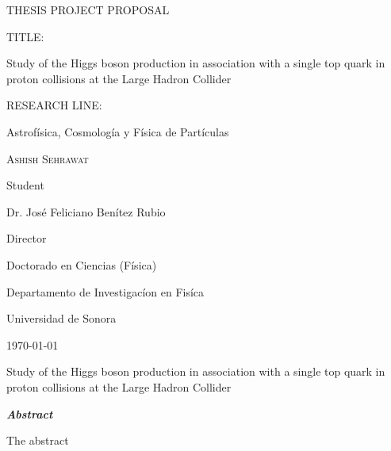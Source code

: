 \documentclass[final,3p]{CSP}
\def\Student{Ashish Sehrawat}
\def\Title{THESIS PROJECT PROPOSAL}
\def\Prog{Doctorado en Ciencias (F\'{i}sica) }
\def\Dept{Departamento de Investigac\'{i}on en Fis\'{i}ca}
\def\Director{Dr. Jos\'{e} Feliciano Ben\'{i}tez Rubio}
\def\ProjectTitle{Study of the Higgs boson production in association with a single top quark in proton collisions at the Large Hadron Collider}
\def\ResearchLine{Astrof\'{i}sica, Cosmolog\'{i}a y F\'{i}sica de Part\'{i}culas}
\begin{document}
\begin{titlepage}
  \centering
  \hspace{0pt}
  \vfill
        {\scshape\Large \Title \par}

	\vspace{2cm}
        \begin{adjustwidth}{2cm}{2cm}{
            TITLE:\par
            {\large \ProjectTitle \par}
          }
        \end{adjustwidth}

	\vspace{0.5cm}
        \begin{adjustwidth}{2cm}{2cm}{
            RESEARCH LINE: \par
            \ResearchLine \par}
        \end{adjustwidth}

        
        \vspace{4cm}
        {\underline{\hspace{8cm}}\par}
	{\scshape\large \Student \par}
        {Student\par}

        \vspace{1cm}
        {\underline{\hspace{8cm}}\par}
	{\Director \par}
        {Director\par}

        \vspace{1cm}
        {\Prog \par}
        {\Dept \par}
        {Universidad de Sonora \par}

        \vspace{4cm}
	{\today}

\hspace{0pt}
\vfill

\end{titlepage}


\shipout\null


\newpage
\hspace{0pt}
\vfill

\begin{adjustwidth}{1cm}{1cm}

  \begin{center}
    {\Large \ProjectTitle \par}
    \vspace{1cm}
    {\itshape\textbf{Abstract}\par}
  \end{center}

  The abstract \par

\end{adjustwidth}
\end{document}
